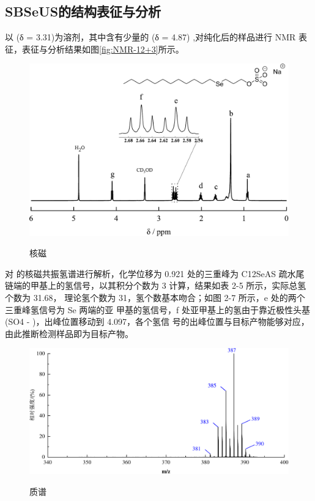 \documentclass[bachelor,fandolfonts,replaceperiod]{jnuthesis}
\begin{document}
    \subsection{SBSeUS的结构表征与分析}
        以 (δ = 3.31)为溶剂，其中含有少量的 (δ = 4.87)\cite{babij2016nmr} ,对纯化后的样品进行
     NMR 表征，表征与分析结果如图\ref{fig:NMR-12+3}所示。
    \begin{figure}[htbp]
        \centering
        \includegraphics[width=.75\textwidth]{figure/nmr123.pdf}\\
        \caption{核磁}\label{fig:NMR-4+11}
    \end{figure}
    
    对  的核磁共振氢谱进行解析，化学位移为 0.921 处的三重峰为 C12SeAS 疏水尾
    链端的甲基上的氢信号，以其积分个数为 3 计算，结果如表 2-5 所示，实际总氢个数为 31.68，
    理论氢个数为 31，氢个数基本吻合；如图 2-7 所示，e 处的两个三重峰氢信号为 Se 两端的亚
    甲基的氢信号，f 处亚甲基上的氢由于靠近极性头基(SO4 - )，出峰位置移动到 4.097，各个氢信
    号的出峰位置与目标产物能够对应，由此推断检测样品即为目标产物。
    \begin{figure}[htbp]
        \centering
        \includegraphics[width=.8\textwidth]{figure/mass123.pdf}\\
        \caption{质谱}\label{fig:mass-4+11}
    \end{figure}
\end{document}
